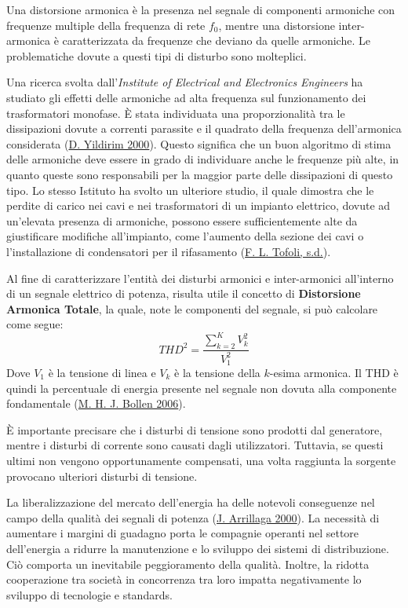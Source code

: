 \documentclass[
  italian,
]{article}
\begin{document}
Una distorsione armonica è la presenza nel segnale di componenti
armoniche con frequenze multiple della frequenza di rete \(f_0\), mentre
una distorsione inter-armonica è caratterizzata da frequenze che deviano
da quelle armoniche. Le problematiche dovute a questi tipi di disturbo
sono molteplici.

Una ricerca svolta dall'\emph{Institute of Electrical and Electronics
Engineers} ha studiato gli effetti delle armoniche ad alta frequenza sul
funzionamento dei trasformatori monofase. È stata individuata una
proporzionalità tra le dissipazioni dovute a correnti parassite e il
quadrato della frequenza dell'armonica considerata
(\protect\hyperlink{ref-transformer-harmonic-loss}{D. Yildirim 2000}).
Questo significa che un buon algoritmo di stima delle armoniche deve
essere in grado di individuare anche le frequenze più alte, in quanto
queste sono responsabili per la maggior parte delle dissipazioni di
questo tipo. Lo stesso Istituto ha svolto un ulteriore studio, il quale
dimostra che le perdite di carico nei cavi e nei trasformatori di un
impianto elettrico, dovute ad un'elevata presenza di armoniche, possono
essere sufficientemente alte da giustificare modifiche all'impianto,
come l'aumento della sezione dei cavi o l'installazione di condensatori
per il rifasamento (\protect\hyperlink{ref-losses-cables}{F. L. Tofoli,
s.d.}).

Al fine di caratterizzare l'entità dei disturbi armonici e
inter-armonici all'interno di un segnale elettrico di potenza, risulta
utile il concetto di \textbf{Distorsione Armonica Totale}, la quale,
note le componenti del segnale, si può calcolare come segue: \[
THD^2 = \frac{\sum_{k=2}^{K} V_k^2}{V_1^2}
\] Dove \(V_1\) è la tensione di linea e \(V_k\) è la tensione della
\(k\)-esima armonica. Il THD è quindi la percentuale di energia presente
nel segnale non dovuta alla componente fondamentale
(\protect\hyperlink{ref-dsp-pqd}{M. H. J. Bollen 2006}).

È importante precisare che i disturbi di tensione sono prodotti dal
generatore, mentre i disturbi di corrente sono causati dagli
utilizzatori. Tuttavia, se questi ultimi non vengono opportunamente
compensati, una volta raggiunta la sorgente provocano ulteriori disturbi
di tensione.

La liberalizzazione del mercato dell'energia ha delle notevoli
conseguenze nel campo della qualità dei segnali di potenza
(\protect\hyperlink{ref-power-quality-deregulation}{J. Arrillaga 2000}).
La necessità di aumentare i margini di guadagno porta le compagnie
operanti nel settore dell'energia a ridurre la manutenzione e lo
sviluppo dei sistemi di distribuzione. Ciò comporta un inevitabile
peggioramento della qualità. Inoltre, la ridotta cooperazione tra
società in concorrenza tra loro impatta negativamente lo sviluppo di
tecnologie e standards.
\end{document}
